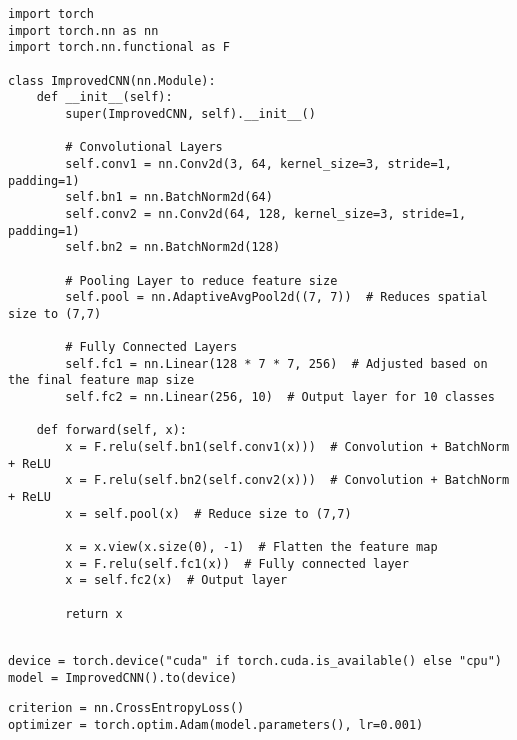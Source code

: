 \begin{verbatim}
import torch
import torch.nn as nn
import torch.nn.functional as F

class ImprovedCNN(nn.Module):
    def __init__(self):
        super(ImprovedCNN, self).__init__()

        # Convolutional Layers
        self.conv1 = nn.Conv2d(3, 64, kernel_size=3, stride=1, padding=1)
        self.bn1 = nn.BatchNorm2d(64)
        self.conv2 = nn.Conv2d(64, 128, kernel_size=3, stride=1, padding=1)
        self.bn2 = nn.BatchNorm2d(128)

        # Pooling Layer to reduce feature size
        self.pool = nn.AdaptiveAvgPool2d((7, 7))  # Reduces spatial size to (7,7)

        # Fully Connected Layers
        self.fc1 = nn.Linear(128 * 7 * 7, 256)  # Adjusted based on the final feature map size
        self.fc2 = nn.Linear(256, 10)  # Output layer for 10 classes

    def forward(self, x):
        x = F.relu(self.bn1(self.conv1(x)))  # Convolution + BatchNorm + ReLU
        x = F.relu(self.bn2(self.conv2(x)))  # Convolution + BatchNorm + ReLU
        x = self.pool(x)  # Reduce size to (7,7)

        x = x.view(x.size(0), -1)  # Flatten the feature map
        x = F.relu(self.fc1(x))  # Fully connected layer
        x = self.fc2(x)  # Output layer

        return x


\end{verbatim}

\begin{verbatim}
device = torch.device("cuda" if torch.cuda.is_available() else "cpu")
model = ImprovedCNN().to(device)

\end{verbatim}

\begin{verbatim}
criterion = nn.CrossEntropyLoss()
optimizer = torch.optim.Adam(model.parameters(), lr=0.001)

\end{verbatim}

